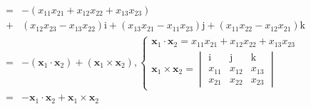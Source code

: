 \documentclass[
]{book}
\theoremstyle{definition}
\theoremstyle{definition}
\theoremstyle{definition}
\theoremstyle{definition}
\theoremstyle{remark}
\begin{document}
\[\begin{aligned}
= & -\left(x_{{\scriptscriptstyle 1}{\scriptscriptstyle 1}}x_{{\scriptscriptstyle 2}{\scriptscriptstyle 1}}+x_{{\scriptscriptstyle 1}{\scriptscriptstyle 2}}x_{{\scriptscriptstyle 2}{\scriptscriptstyle 2}}+x_{{\scriptscriptstyle 1}{\scriptscriptstyle 3}}x_{{\scriptscriptstyle 2}{\scriptscriptstyle 3}}\right)\\
+ & \left(x_{{\scriptscriptstyle 1}{\scriptscriptstyle 2}}x_{{\scriptscriptstyle 2}{\scriptscriptstyle 3}}-x_{{\scriptscriptstyle 1}{\scriptscriptstyle 3}}x_{{\scriptscriptstyle 2}{\scriptscriptstyle 2}}\right)\mathrm{i}+\left(x_{{\scriptscriptstyle 1}{\scriptscriptstyle 3}}x_{{\scriptscriptstyle 2}{\scriptscriptstyle 1}}-x_{{\scriptscriptstyle 1}{\scriptscriptstyle 1}}x_{{\scriptscriptstyle 2}{\scriptscriptstyle 3}}\right)\mathrm{j}+\left(x_{{\scriptscriptstyle 1}{\scriptscriptstyle 1}}x_{{\scriptscriptstyle 2}{\scriptscriptstyle 2}}-x_{{\scriptscriptstyle 1}{\scriptscriptstyle 2}}x_{{\scriptscriptstyle 2}{\scriptscriptstyle 1}}\right)\mathrm{k}\\
= & -\left(\boldsymbol{x}_{{\scriptscriptstyle 1}}\cdot\boldsymbol{x}_{{\scriptscriptstyle 2}}\right)+\left(\boldsymbol{x}_{{\scriptscriptstyle 1}}\times\boldsymbol{x}_{{\scriptscriptstyle 2}}\right),\begin{cases}
\boldsymbol{x}_{{\scriptscriptstyle 1}}\cdot\boldsymbol{x}_{{\scriptscriptstyle 2}}=x_{{\scriptscriptstyle 1}{\scriptscriptstyle 1}}x_{{\scriptscriptstyle 2}{\scriptscriptstyle 1}}+x_{{\scriptscriptstyle 1}{\scriptscriptstyle 2}}x_{{\scriptscriptstyle 2}{\scriptscriptstyle 2}}+x_{{\scriptscriptstyle 1}{\scriptscriptstyle 3}}x_{{\scriptscriptstyle 2}{\scriptscriptstyle 3}}\\
\boldsymbol{x}_{{\scriptscriptstyle 1}}\times\boldsymbol{x}_{{\scriptscriptstyle 2}}=\begin{vmatrix}\mathrm{i} & \mathrm{j} & \mathrm{k}\\
x_{{\scriptscriptstyle 1}{\scriptscriptstyle 1}} & x_{{\scriptscriptstyle 1}{\scriptscriptstyle 2}} & x_{{\scriptscriptstyle 1}{\scriptscriptstyle 3}}\\
x_{{\scriptscriptstyle 2}{\scriptscriptstyle 1}} & x_{{\scriptscriptstyle 2}{\scriptscriptstyle 2}} & x_{{\scriptscriptstyle 2}{\scriptscriptstyle 3}}
\end{vmatrix}
\end{cases}\\
= & -\boldsymbol{x}_{{\scriptscriptstyle 1}}\cdot\boldsymbol{x}_{{\scriptscriptstyle 2}}+\boldsymbol{x}_{{\scriptscriptstyle 1}}\times\boldsymbol{x}_{{\scriptscriptstyle 2}}
\end{aligned}
\]
\end{document}
